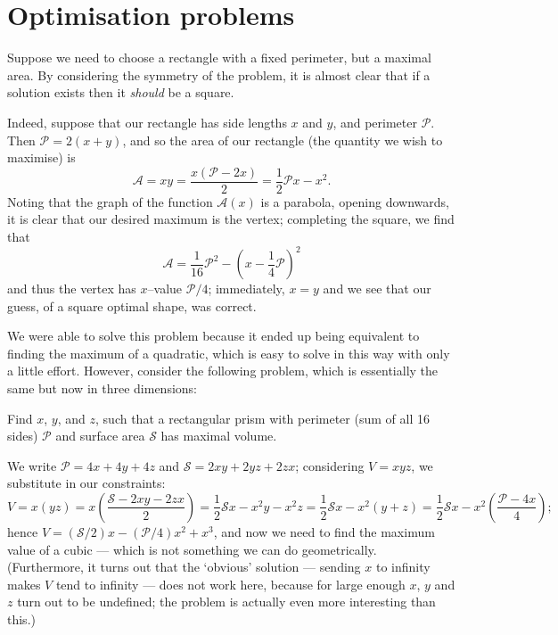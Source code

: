 \section{Optimisation problems}
Suppose we need to choose a rectangle with a fixed perimeter, but a maximal area. By considering the
symmetry of the problem, it is almost clear that if a solution exists then it \emph{should} be a square.

Indeed, suppose that our rectangle has side lengths $ x $ and $ y $, and perimeter $ \mathcal{P} $. Then $ \mathcal{P} = 2(x + y) $,
and so the area of our rectangle (the quantity we wish to maximise) is
\begin{displaymath}
  \mathcal{A} = xy = \frac{x(\mathcal{P} - 2x)}{2} = \frac{1}{2}\mathcal{P}x - x^2.
\end{displaymath}
Noting that the graph of the function $ \mathcal{A}(x) $ is a parabola, opening downwards, it is clear
that our desired maximum is the vertex; completing the square, we find that
\begin{displaymath}
  \mathcal{A} = \frac{1}{16}\mathcal{P}^2 - \left(x - \frac{1}{4}\mathcal{P}\right)^2
\end{displaymath}
and thus the vertex has $ x$--value $ \mathcal{P}/4 $; immediately, $ x = y $ and we see that our guess,
of a square optimal shape, was correct.

We were able to solve this problem because it ended up being equivalent to finding the maximum of a quadratic,
which is easy to solve in this way with only a little effort. However, consider the following problem, which is
essentially the same but now in three dimensions:
\begin{pro}
  Find $ x $, $ y $, and $ z $, such that a rectangular prism with perimeter (sum of all 16 sides) $ \mathcal{P} $
  and surface area $ \mathcal{S} $ has maximal volume.
\end{pro}
We write $ \mathcal{P} = 4x + 4y + 4z $ and $ \mathcal{S} = 2xy + 2yz + 2zx $; considering $ V = xyz $, we substitute
in our constraints:
\begin{displaymath}
  V = x(yz) = x\left(\frac{\mathcal{S} - 2xy - 2zx}{2}\right) = \frac{1}{2}\mathcal{S}x - x^2 y - x^2 z
    = \frac{1}{2}\mathcal{S}x - x^2 (y + z) = \frac{1}{2}\mathcal{S}x - x^2 \left(\frac{\mathcal{P} - 4x}{4}\right);
\end{displaymath}
hence $ V = (\mathcal{S}/2)x - (\mathcal{P}/4)x^2 + x^3 $, and now we need to find the maximum value of a cubic --- which
is not something we can do geometrically. (Furthermore, it turns out that the `obvious' solution --- sending $ x $ to
infinity makes $ V $ tend to infinity --- does not work here, because for large enough $ x $, $ y $ and $ z $ turn out to be
undefined; the problem is actually even more interesting than this.)


